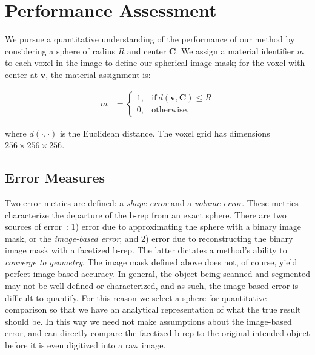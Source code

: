 \section{Performance Assessment}
\label{sec:Performance Assessment}

We pursue a quantitative understanding of the performance of our method by considering a sphere of radius $R$ and center $\bm{C}$.  We assign a material identifier $m$ to each voxel in the image to define our spherical image mask; for the voxel with center at $\bm{v}$, the material assignment is:
\begin{linenomath}\begin{align} 
	m &=  \begin{cases}
		1, & \text{if}\ d \left(\bm{v},\bm{C}\right) \le R \\
		0, & \text{otherwise},
	\end{cases}
\end{align}\end{linenomath}
where $d(\cdot,\cdot)$ is the Euclidean distance. The voxel grid has dimensions $256 \times 256 \times 256$.
\subsection{Error Measures}
\label{Error Measures}

Two error metrics are defined: a {\em shape error} and a {\em volume error}. These metrics characterize the departure of the b-rep from an exact sphere. There are two sources of error~\cite{young_2008}: 1) error due to approximating the sphere with a binary image mask, or the {\em image-based error}; and 2) error due to reconstructing the binary image mask with a facetized b-rep. The latter dictates a method's ability to {\em converge to geometry}. The image mask defined above does not, of course, yield perfect image-based accuracy. In general, the object being scanned and segmented may not be well-defined or characterized, and as such, the image-based error is difficult to quantify. For this reason we select a sphere for quantitative comparison so that we have an analytical representation of what the true result should be. In this way we need not make assumptions about the image-based error, and can directly compare the facetized b-rep to the original intended object before it is even digitized into a raw image.

